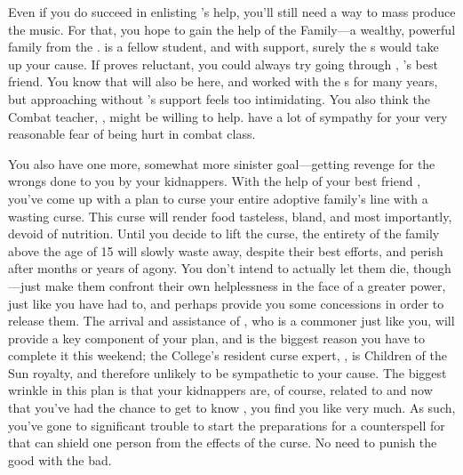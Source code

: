 \documentclass[char]{GL2020}
\begin{document}
Even if you do succeed in enlisting \cMusic{}'s help, you'll still need a way to mass produce the music. For that, you hope to gain the help of the \cHeir{\formal} Family---a wealthy, powerful family from the \pTech{}. \cHeir{\full} is a fellow student, and with \cHeir{\their} support, surely the \cHeir{\formal}s would take up your cause. If \cHeir{} proves reluctant, you could always try going through \cAmbition{}, \cHeir{}'s best friend. You know that \cDiplomat{\full} will also be here, and \cDiplomat{\they} \cDiplomat{\have} worked with the \cHeir{\formal}s for many years, but approaching \cDiplomat{\them} without \cHeir{}'s support feels too intimidating. You also think the Combat teacher, \cInterpol{\full}, might be willing to help. \cInterpol{\They} have a lot of sympathy for your very reasonable fear of being hurt in combat class.

You also have one more, somewhat more sinister goal---getting revenge for the wrongs done to you by your kidnappers. With the help of your best friend \cLibAssist{\full}, you've come up with a plan to curse your entire adoptive family's line with a wasting curse. This curse will render food tasteless, bland, and most importantly, devoid of nutrition. Until you decide to lift the curse, the entirety of the \cAdopted{\formal} family above the age of 15 will slowly waste away, despite their best efforts, and perish after months or years of agony. You don't intend to actually let them die, though---just make them confront their own helplessness in the face of a greater power, just like you have had to, and perhaps provide you some concessions in order to release them. The arrival and assistance of \cCurse{}, who is a commoner just like you, will provide a key component of your plan, and is the biggest reason you have to complete it this weekend; the College's resident curse expert, \cPrince{\Heir} \cPrince{}, is Children of the Sun royalty, and therefore unlikely to be sympathetic to your cause. The biggest wrinkle in this plan is that your kidnappers are, of course, related to \cMusic{} and now that you've had the chance to get to know \cMusic{\them}, you find you like \cMusic{\them} very much. As such, you've gone to significant trouble to start the preparations for a counterspell for \cMusic{\them} that can shield one person from the effects of the curse. No need to punish the good with the bad.
\end{document}
